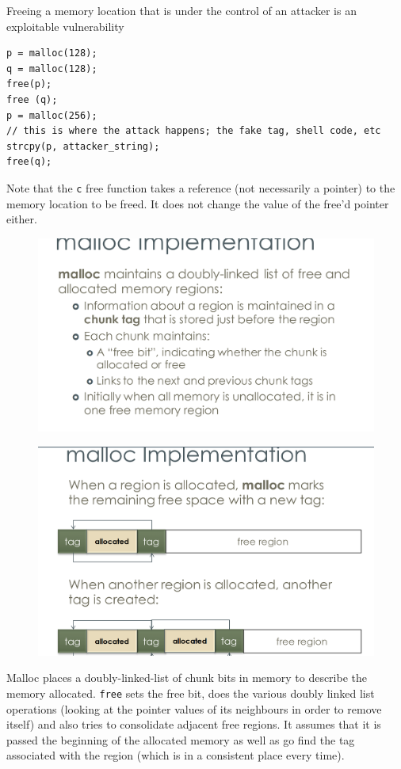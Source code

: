 \documentclass[../notes.tex]{subfiles}
\begin{document}
Freeing a memory location that is under the control of an attacker is an exploitable vulnerability


\begin{listing}[H]
\begin{verbatim}
p = malloc(128);
q = malloc(128);
free(p);
free (q);
p = malloc(256);
// this is where the attack happens; the fake tag, shell code, etc
strcpy(p, attacker_string);
free(q);
\end{verbatim}
\end{listing}

Note that the \texttt{c} free function takes a reference (not necessarily a pointer) to the memory location to be freed. It does not change the value of the free'd pointer either.

\begin{figure}[H]
    \centering
    \includegraphics[width=0.8\linewidth]{img/image_2023-01-16-20-08-50.png}
\end{figure}

\begin{figure}[H]
    \centering
    \includegraphics[width=0.8\linewidth]{img/image_2023-01-16-20-09-02.png}
\end{figure}

Malloc places a doubly-linked-list of chunk bits in memory to describe the memory allocated. \texttt{free} sets the free bit, does the various doubly linked list operations (looking at the pointer values of its neighbours in order to remove itself) and also tries to consolidate adjacent free regions.
It assumes that it is passed the beginning of the allocated memory as well as go find the tag associated with the region (which is in a consistent place every time).
\end{document}
